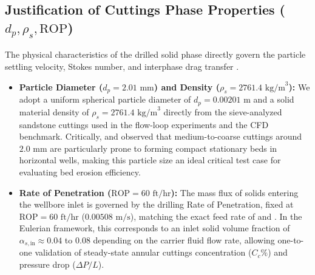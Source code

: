 \subsection{Justification of Cuttings Phase Properties ($d_p, \rho_s, \text{ROP}$)}
The physical characteristics of the drilled solid phase directly govern the particle settling velocity, Stokes number, and interphase drag transfer \citep{Hajipour2020, Khaled2020}. 
\begin{itemize}
    \item \textbf{Particle Diameter ($d_p = 2.01\text{ mm}$) and Density ($\rho_s = 2761.4\text{ kg/m}^3$):} We adopt a uniform spherical particle diameter of $d_p = 0.00201\text{ m}$ and a solid material density of $\rho_s = 2761.4\text{ kg/m}^3$ directly from the sieve-analyzed sandstone cuttings used in the \citet{Osgouei2010} flow-loop experiments and the \citet{Shehab2015} CFD benchmark. Critically, \citet{Sorgun2010} and \citet{Hajipour2020} observed that medium-to-coarse cuttings around $2.0\text{ mm}$ are particularly prone to forming compact stationary beds in horizontal wells, making this particle size an ideal critical test case for evaluating bed erosion efficiency.
    \item \textbf{Rate of Penetration ($\text{ROP} = 60\text{ ft/hr}$):} The mass flux of solids entering the wellbore inlet is governed by the drilling Rate of Penetration, fixed at $\text{ROP} = 60\text{ ft/hr}$ ($0.00508\text{ m/s}$), matching the exact feed rate of \citet{Osgouei2010} and \citet{Shehab2015}. In the Eulerian framework, this corresponds to an inlet solid volume fraction of $\alpha_{s,\text{in}} \approx 0.04$ to $0.08$ depending on the carrier fluid flow rate, allowing one-to-one validation of steady-state annular cuttings concentration ($C_c\%$) and pressure drop ($\Delta P/L$).
\end{itemize}

